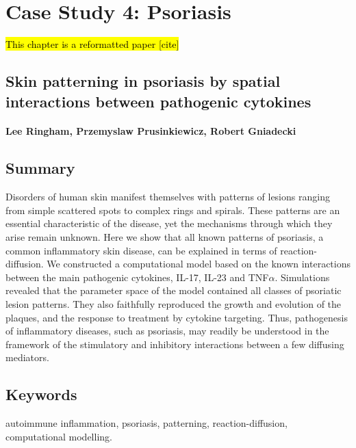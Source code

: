 \chapter{Case Study 4: Psoriasis}

\hl{This chapter is a reformatted paper [cite]}

\section*{Skin patterning in psoriasis by spatial interactions between pathogenic cytokines}
\subsubsection*{Lee Ringham, Przemyslaw Prusinkiewicz, Robert Gniadecki}

\section{Summary} 
Disorders of human skin manifest themselves with patterns of lesions ranging from simple scattered spots to complex rings and spirals. These patterns are an essential characteristic of the disease, yet the mechanisms through which they arise remain unknown. Here we show that all known patterns of psoriasis, a common inflammatory skin disease, can be explained in terms of reaction-diffusion. We constructed a computational model based on the known interactions between the main pathogenic cytokines, IL-17, IL-23 and TNF$\alpha$. Simulations revealed that the parameter space of the model contained all classes of psoriatic lesion patterns. They also faithfully reproduced the growth and evolution of the plaques, and the response to treatment by cytokine targeting. Thus, pathogenesis of inflammatory diseases, such as psoriasis, may readily be understood in the framework of the stimulatory and inhibitory interactions between a few diffusing mediators.

\section{Keywords}
autoimmune inflammation, psoriasis, patterning, reaction-diffusion, computational modelling.

